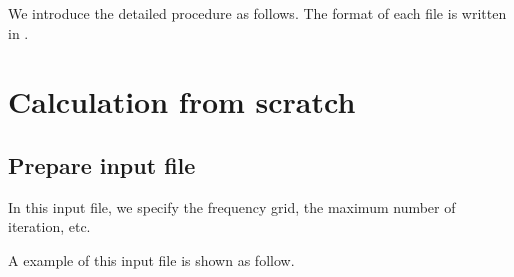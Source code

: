 \documentclass[letterpaper,10pt,dvipdfmx,openany,english]{sphinxmanual}
\begin{document}
We introduce the detailed procedure as follows.
The format of each file is written in {\hyperref[\detokenize{shiftk_format_en:fileformat}]{}}.


\section{Calculation from scratch}
\label{\detokenize{shiftk_flow_en:calculation-from-scratch}}

\subsection{Prepare input file}
\label{\detokenize{shiftk_flow_en:prepare-input-file}}
In this input file, we specify the frequency grid,
the maximum number of iteration, etc.

A example of this input file is shown as follow.

\begin{sphinxVerbatim}[commandchars=\\\{\}]
    
    
  
  
  
  
  
    
    
    
    
     
      
    
\end{sphinxVerbatim}
\end{document}
